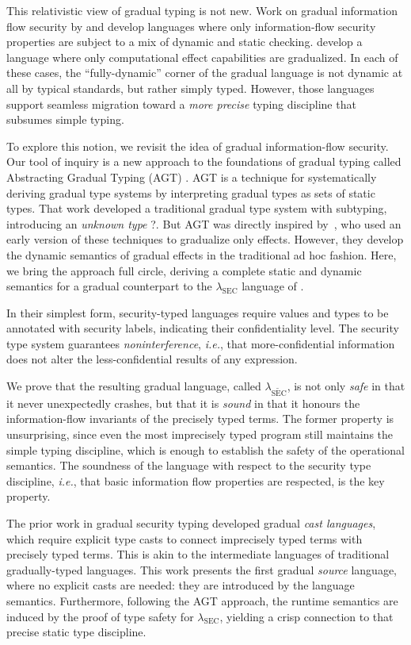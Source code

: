 \documentclass[authoryear,sort&compress,9pt,twocolumn,nocopyrightspace]{sigplanconf}
\newcommand{\lsec}{$\lambda_\text{SEC}$\xspace}
\newcommand{\lgsec}{$\lambda_{\consistent{\text{SEC}}}$\xspace}
\newcommand{\?}{\textsf{\upshape ?}} \newcommand{\consistent}[1]{\widetilde{#1}}
\newcommand{\ie}{\emph{i.e.}\xspace}
\begin{document}
This relativistic view of gradual typing is not new.  Work on gradual
information flow security by \citet{disney11flow} and
\citet{fennellThiemann:csf2013} develop languages where only information-flow
security properties are subject to a mix of dynamic and static checking.
\citet{banados14effects} develop a language where only computational effect
capabilities are gradualized.  In each of these cases, the ``fully-dynamic''
corner of the gradual language is not dynamic at all by typical standards, but
rather simply typed.  However, those languages support seamless migration
toward a \emph{more precise} typing discipline that subsumes simple typing.

To explore this notion, we revisit the idea of gradual information-flow
security.  Our tool of inquiry is a new approach to the foundations of gradual
typing called Abstracting Gradual Typing (AGT) \cite{garciaAl:popl2016}.  AGT
is a technique for systematically deriving gradual type systems by interpreting
gradual types as sets of static types.  That work developed a traditional
gradual type system with subtyping, introducing an \emph{unknown type} \?. But
AGT was directly inspired by~\citet{banados14effects}, who used an early
version of these techniques to gradualize only effects. However, they develop
the dynamic semantics of gradual effects in the traditional ad hoc fashion.
Here, we bring the approach full circle, deriving a complete static and dynamic
semantics for a gradual counterpart to the \lsec language of \citet{zdancewic}.

In their simplest form, security-typed languages require values and types to be
annotated with security labels, indicating their confidentiality level.  The
security type system guarantees \emph{noninterference}, \ie, that
more-confidential information does not alter the less-confidential results of
any expression.

We prove that the resulting gradual language, called \lgsec, is not only
\emph{safe} in that it never unexpectedly crashes, but that it is \emph{sound}
in that it honours the information-flow invariants of the precisely typed
terms.  The former property is unsurprising, since even the most imprecisely
typed program still maintains the simple typing discipline, which is enough to
establish the safety of the operational semantics.  The soundness of the
language with respect to the security type discipline, \ie, that basic
information flow properties are respected, is the key property.

The prior work in gradual security typing developed gradual \emph{cast
  languages}, which require explicit type casts to connect imprecisely typed
terms with precisely typed terms.  This is akin to the intermediate languages
of traditional gradually-typed languages.  This work presents the first gradual
\emph{source} language, where no explicit casts are needed: they are introduced
by the language semantics.  Furthermore, following the AGT approach, the
runtime semantics are induced by the proof of type safety for \lsec, yielding a
crisp connection to that precise static type discipline.
\end{document}
